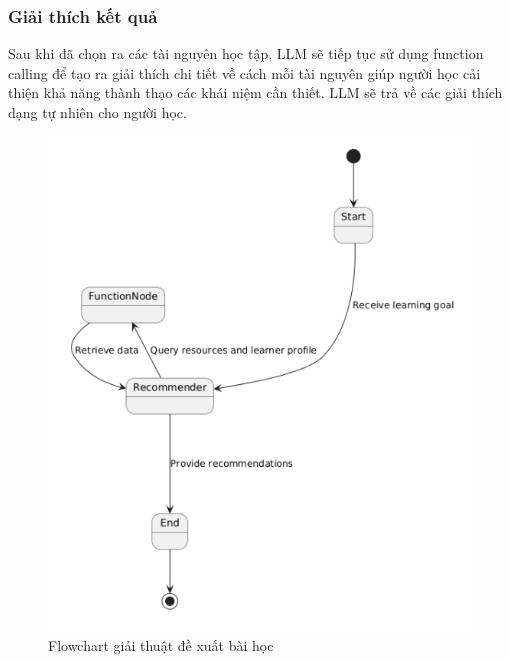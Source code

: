 \subsubsection{ Giải thích kết quả}
Sau khi đã chọn ra các tài nguyên học tập, LLM sẽ tiếp tục sử dụng function calling để tạo ra giải thích chi tiết về cách mỗi tài nguyên giúp người học cải thiện khả năng thành thạo các khái niệm cần thiết. LLM sẽ trả về các giải thích dạng tự nhiên cho người học.
\begin{figure}[H]
    \centering
    \includegraphics[width=0.7\linewidth]{Images/Anh/giaithuat.png}
    \caption{Flowchart giải thuật đề xuất bài học}
    \label{fig:enter-label}
\end{figure}
